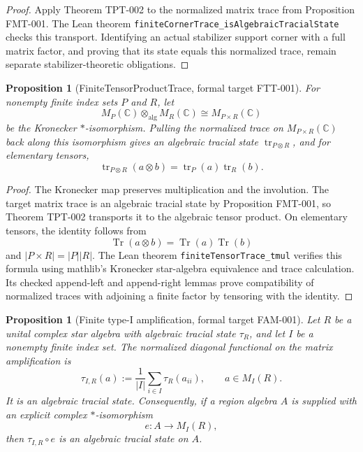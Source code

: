 \documentclass{article}
\newtheorem{proposition}[definition]{Proposition}
\begin{document}
\begin{proof}
Apply Theorem TPT-002 to the normalized matrix trace from Proposition
FMT-001.  The Lean theorem
\texttt{finiteCornerTrace\_isAlgebraicTracialState}
checks this transport.  Identifying an actual stabilizer support corner with a
full matrix factor, and proving that its state equals this normalized trace,
remain separate stabilizer-theoretic obligations.
\end{proof}

\begin{proposition}[FiniteTensorProductTrace, formal target FTT-001]
For nonempty finite index sets \(P\) and \(R\), let
\begin{equation*}
  M_P(\mathbb C)\otimes_{\mathrm{alg}}M_R(\mathbb C)
  \cong M_{P\times R}(\mathbb C)
\end{equation*}
be the Kronecker \(*\)-isomorphism.  Pulling the normalized trace on
\(M_{P\times R}(\mathbb C)\) back along this isomorphism gives an algebraic
tracial state \(\operatorname{tr}_{P\otimes R}\), and for elementary tensors,
\begin{equation*}
  \operatorname{tr}_{P\otimes R}(a\otimes b)
  =\operatorname{tr}_P(a)\operatorname{tr}_R(b).
\end{equation*}
\end{proposition}

\begin{proof}
The Kronecker map preserves multiplication and the involution.  The target
matrix trace is an algebraic tracial state by Proposition FMT-001, so
Theorem TPT-002 transports it to the algebraic tensor product.  On elementary
tensors, the identity follows from
\begin{equation*}
  \operatorname{Tr}(a\otimes b)=\operatorname{Tr}(a)\operatorname{Tr}(b)
\end{equation*}
and \(|P\times R|=|P||R|\).  The Lean theorem
\texttt{finiteTensorTrace\_tmul} verifies this formula using mathlib's
Kronecker star-algebra equivalence and trace calculation.
Its checked append-left and append-right lemmas prove compatibility of
normalized traces with adjoining a finite factor by tensoring with the
identity.
\end{proof}

\begin{proposition}[Finite type-I amplification, formal target FAM-001]
Let \(R\) be a unital complex star algebra with algebraic tracial state
\(\tau_R\), and let \(I\) be a nonempty finite index set.  The normalized
diagonal functional on the matrix amplification is
\begin{equation*}
  \tau_{I,R}(a):=\frac{1}{|I|}\sum_{i\in I}\tau_R(a_{ii}),
  \qquad a\in M_I(R).
\end{equation*}
It is an algebraic tracial state.  Consequently, if a region algebra \(A\)
is supplied with an explicit complex \(*\)-isomorphism
\begin{equation*}
  e:A\longrightarrow M_I(R),
\end{equation*}
then \(\tau_{I,R}\circ e\) is an algebraic tracial state on \(A\).
\end{proposition}
\end{document}
